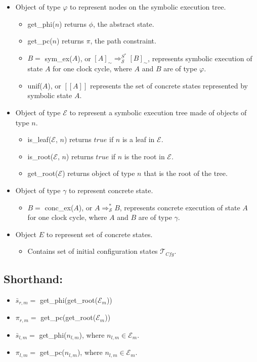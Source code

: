 \documentclass[a4paper]{article}
\begin{document}
\begin{itemize}

\item Object of type $\varphi$ to represent nodes on the symbolic execution tree.

\begin{itemize}
\item  get\_phi($n$)  returns $\phi$, the abstract state.
\item  get\_pc($n$) returns $\pi$, the path constraint.
\item $B =$ sym\_ex($A$), or $[A]_\sim \Rightarrow_{\mathcal{S}}^{S^*} [B]_\sim$, represents symbolic execution of state $A$ for one clock cycle, where $A$ and $B$ are of type $\varphi$.
\item unif($A$), or $[\![ A ]\!]$  represents the set of concrete states represented by symbolic state $A$. 

\end{itemize}
\item Object of type $\mathcal{E}$ to represent a symbolic execution tree made of objects of type $n$.
\begin{itemize}
\item  is\_leaf($\mathcal{E}$, $n$)  returns $true$ if $n$ is a leaf in $\mathcal{E}$.
\item is\_root($\mathcal{E}$, $n$) returns $true$ if $n$ is the root in $\mathcal{E}$.
\item get\_root($\mathcal{E}$)  returns object of type $n$ that is the root of the tree.

\end{itemize}


\item Object of type $\gamma$ to represent concrete state.
\begin{itemize}
\item $B =$ conc\_ex($A$), or $A \Rightarrow_{\mathcal{S}}^* B$, represents concrete execution of state $A$ for one clock cycle, where $A$ and $B$ are of type $\gamma$.

\end{itemize}
\item Object $E$ to represent set of concrete states.
\begin{itemize}
\item Contains set of initial configuration states $\mathcal{T}_{\mathit{Cfg}}$.
\end{itemize}
\end{itemize}


\subsection*{Shorthand:}
\begin{itemize}
\item $\bar{s}_{r,m} =$ get\_phi(get\_root($\mathcal{E}_m$)) 
\item $\pi_{r,m} =$ get\_pc(get\_root($\mathcal{E}_m$)) 
\item $ \bar{s}_{l,m} =$ get\_phi($n_{l,m}$), where $n_{l,m} \in \mathcal{E}_m$.
\item $ \pi_{l,m} =$ get\_pc($n_{l,m}$), where $n_{l,m} \in \mathcal{E}_m$.
\end{itemize}
\end{document}
